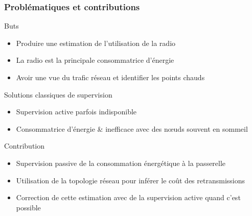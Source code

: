 \begin{frame}\frametitle{Problématiques et contributions}

  \begin{block}{Buts}
    \begin{itemize}
      \item Produire une estimation de l'utilisation de la radio
      \item La radio est la principale consommatrice d'énergie
      \item Avoir une vue du trafic réseau et identifier les points chauds
    \end{itemize}
  \end{block}

  \begin{block}{Solutions classiques de supervision}
    \begin{itemize}
      \item Supervision active parfois indisponible
      \item Consommatrice d'énergie \& inefficace avec des nœuds souvent en sommeil
    \end{itemize}
  \end{block}

  \begin{alertblock}{Contribution}
    \begin{itemize}
      \item Supervision passive de la consommation énergétique à la passerelle
      \item Utilisation de la topologie réseau pour inférer le coût des retransmissions
      \item Correction de cette estimation avec de la supervision active quand c'est possible
    \end{itemize}
  \end{alertblock}

\end{frame}

